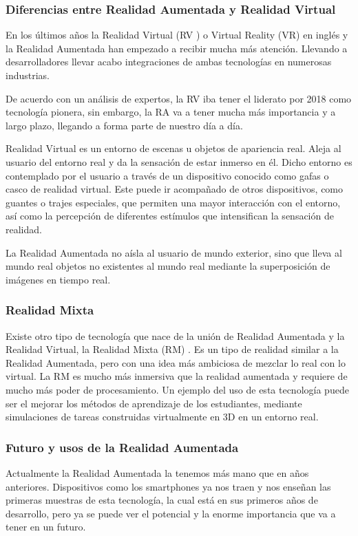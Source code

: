 \subsubsection{Diferencias entre Realidad Aumentada y Realidad Virtual}
En los últimos años la Realidad Virtual (RV  \cite{URL::VR})  o Virtual Reality (VR) en inglés y la Realidad Aumentada han empezado a recibir mucha más atención. Llevando a desarrolladores llevar acabo integraciones de ambas tecnologías en numerosas industrias.

De acuerdo con un análisis de expertos, la RV iba tener el liderato por 2018 como tecnología pionera, sin embargo, la RA va a tener mucha más importancia y a largo plazo, llegando a forma parte de nuestro día a día.

Realidad Virtual es un entorno de escenas u objetos de apariencia real. Aleja al usuario del entorno real y da la sensación de estar inmerso en él. Dicho entorno es contemplado por el usuario a través de un dispositivo conocido como gafas o casco de realidad virtual. Este puede ir acompañado de otros dispositivos, como guantes o trajes especiales, que permiten una mayor interacción con el entorno, así como la percepción de diferentes estímulos que intensifican la sensación de realidad.

La Realidad Aumentada no aísla al usuario de mundo exterior, sino que lleva al mundo real objetos no existentes al mundo real mediante la superposición de imágenes en tiempo real. 

\subsubsection{Realidad Mixta}

Existe otro tipo de tecnología que nace de la unión de Realidad Aumentada y la Realidad Virtual, la Realidad Mixta (RM) \cite{URL::RM}. Es un tipo de realidad similar a la Realidad Aumentada, pero con una idea más ambiciosa de mezclar lo real con lo virtual. La RM es mucho más inmersiva que la realidad aumentada y requiere de mucho más poder de procesamiento. Un ejemplo del uso de esta tecnología puede ser el mejorar los métodos de aprendizaje de los estudiantes, mediante simulaciones de tareas construidas virtualmente en 3D en un entorno real.  

\subsubsection{Futuro y usos de la Realidad Aumentada}
Actualmente la Realidad Aumentada la tenemos más mano que en años anteriores. Dispositivos como los smartphones ya nos traen y nos enseñan las primeras muestras de esta tecnología, la cual está en sus primeros años de desarrollo, pero ya se puede ver el potencial y la enorme importancia que va a tener en un futuro.

